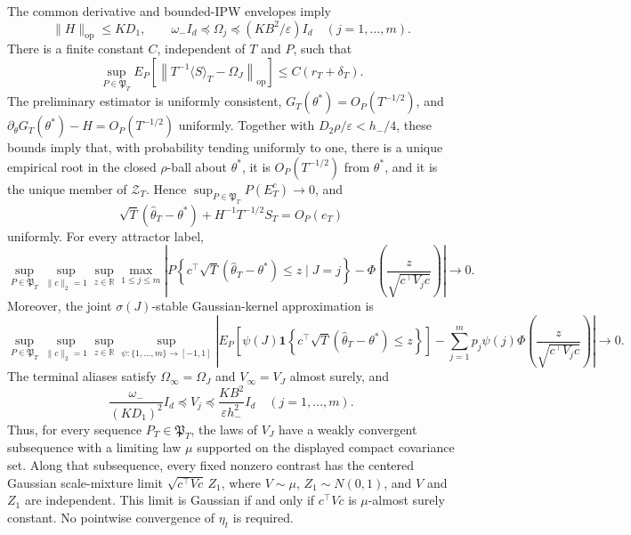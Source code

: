 The common derivative and bounded-IPW envelopes imply
\[
 \|H\|_{\mathrm{op}}\le KD_1,\qquad
 \omega_-I_d\preceq\Omega_j\preceq(KB^2/\varepsilon)I_d
 \quad (j=1,\ldots,m).
\]
There is a finite constant \(C\), independent of \(T\) and \(P\), such that
\[
 \sup_{P\in\mathfrak P_T}E_P\!\left[
 \left\|T^{-1}\langle S\rangle_T-\Omega_J\right\|_{\mathrm{op}}\right]
 \le C(r_T+\delta_T).
\]
The preliminary estimator is uniformly consistent, \(G_T(\theta^*)=O_P(T^{-1/2})\), and \(\partial_\theta G_T(\theta^*)-H=O_P(T^{-1/2})\) uniformly. Together with \(D_2\rho/\varepsilon<h_-/4\), these bounds imply that, with probability tending uniformly to one, there is a unique empirical root in the closed \(\rho\)-ball about \(\theta^*\), it is \(O_P(T^{-1/2})\) from \(\theta^*\), and it is the unique member of \(\mathcal Z_T\). Hence \(\sup_{P\in\mathfrak P_T}P(E_T^c)\to0\), and
\[
 \sqrt T(\widehat\theta_T-\theta^*)+H^{-1}T^{-1/2}S_T=O_P(e_T)
\]
uniformly. For every attractor label,
\[
 \sup_{P\in\mathfrak P_T}\sup_{\|c\|_2=1}\sup_{z\in\mathbb R}
 \max_{1\le j\le m}
 \left|P\!\left\{c^\top\sqrt T(\widehat\theta_T-\theta^*)\le z\mid J=j\right\}
 -\Phi\!\left(\frac{z}{\sqrt{c^\top V_jc}}\right)\right|\longrightarrow0.
\]
Moreover, the joint \(\sigma(J)\)-stable Gaussian-kernel approximation is
\[
 \sup_{P\in\mathfrak P_T}\sup_{\|c\|_2=1}\sup_{z\in\mathbb R}
 \sup_{\psi:\{1,\ldots,m\}\to[-1,1]}
 \left|E_P\!\left[\psi(J)\mathbf1\!\left\{
 c^\top\sqrt T(\widehat\theta_T-\theta^*)\le z\right\}\right]
 -\sum_{j=1}^mp_j\psi(j)\Phi\!\left(\frac{z}{\sqrt{c^\top V_jc}}\right)\right|
 \longrightarrow0.
\]
The terminal aliases satisfy \(\Omega_\infty=\Omega_J\) and \(V_\infty=V_J\) almost surely, and
\[
 \frac{\omega_-}{(KD_1)^2}I_d\preceq V_j
 \preceq\frac{KB^2}{\varepsilon h_-^2}I_d
 \quad (j=1,\ldots,m).
\]
Thus, for every sequence \(P_T\in\mathfrak P_T\), the laws of \(V_J\) have a weakly convergent subsequence with a limiting law \(\mu\) supported on the displayed compact covariance set. Along that subsequence, every fixed nonzero contrast has the centered Gaussian scale-mixture limit \(\sqrt{c^\top Vc}\,Z_1\), where \(V\sim\mu\), \(Z_1\sim N(0,1)\), and \(V\) and \(Z_1\) are independent. This limit is Gaussian if and only if \(c^\top Vc\) is \(\mu\)-almost surely constant. No pointwise convergence of \(\eta_t\) is required.